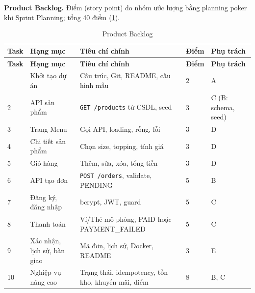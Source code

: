 \textbf{Product Backlog.} Điểm (story point) do nhóm ước lượng bằng planning poker khi Sprint Planning; tổng 40 điểm (\cref{tab:backlog}).
\begin{longtable}{@{}p{1cm}p{3.3cm}p{4.8cm}p{1cm}p{2.4cm}@{}}
\caption{Product Backlog}\label{tab:backlog}\\
\toprule \textbf{Task} & \textbf{Hạng mục} & \textbf{Tiêu chí chính} & \textbf{Điểm} & \textbf{Phụ trách} \\ \midrule \endfirsthead
\toprule \textbf{Task} & \textbf{Hạng mục} & \textbf{Tiêu chí chính} & \textbf{Điểm} & \textbf{Phụ trách} \\ \midrule \endhead
\bottomrule \endlastfoot
1 & Khởi tạo dự án & Cấu trúc, Git, README, cấu hình mẫu & 2 & A \\
2 & API sản phẩm & \texttt{GET /products} từ CSDL, seed & 3 & C (B: schema, seed) \\
3 & Trang Menu & Gọi API, loading, rỗng, lỗi & 3 & D \\
4 & Chi tiết sản phẩm & Chọn size, topping, tính giá & 3 & D \\
5 & Giỏ hàng & Thêm, sửa, xóa, tổng tiền & 3 & D \\
6 & API tạo đơn & \texttt{POST /orders}, validate, PENDING & 5 & B \\
7 & Đăng ký, đăng nhập & bcrypt, JWT, guard & 5 & C \\
8 & Thanh toán & Ví/Thẻ mô phỏng, PAID hoặc PAYMENT\_FAILED & 5 & C \\
9 & Xác nhận, lịch sử, bàn giao & Mã đơn, lịch sử, Docker, README & 3 & E \\
10 & Nghiệp vụ nâng cao & Trạng thái, idempotency, tồn kho, khuyến mãi, điểm & 8 & B, C \\
\end{longtable}

